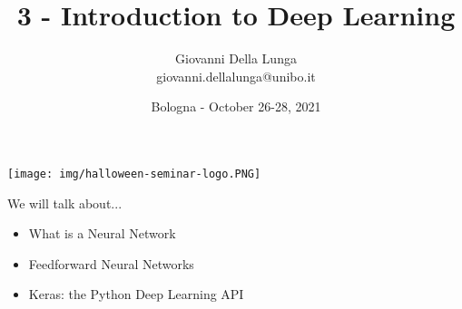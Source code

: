 \documentclass[11pt]{beamer}
\author{Giovanni Della Lunga\\{\footnotesize giovanni.dellalunga@unibo.it}}
\title{3 - Introduction to Deep Learning}
\subtitle{} %
\institute{Halloween Conference in Quantitative Finance}
\date{Bologna - October 26-28, 2021}
\begin{document}
\begin{frame}
\texttt{[image: img/halloween-seminar-logo.PNG]}
\end{frame}

\begin{frame}
\titlepage
\end{frame}

\AtBeginSubsection{\frame{\subsectionpage}}


\begin{frame}{We will talk about...}
\begin{itemize}
\item What is a Neural Network
\item Feedforward Neural Networks
\item Keras: the Python Deep Learning API  
\end{itemize}
\end{frame}
\end{document}
